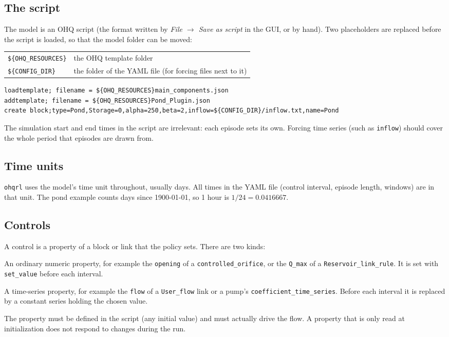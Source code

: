 \documentclass[11pt]{article}
\newcommand{\code}[1]{\texttt{#1}}
\begin{document}
\subsection{The script}
The model is an OHQ script (the format written by \emph{File $\to$ Save
as script} in the GUI, or by hand). Two placeholders are replaced before
the script is loaded, so that the model folder can be moved:
\begin{center}\small
\begin{tabular}{@{}ll@{}}
\toprule
\code{\$\{OHQ\_RESOURCES\}} & the OHQ template folder\\
\code{\$\{CONFIG\_DIR\}} & the folder of the YAML file (for forcing files next to it)\\
\bottomrule
\end{tabular}
\end{center}
\begin{lstlisting}
loadtemplate; filename = ${OHQ_RESOURCES}main_components.json
addtemplate; filename = ${OHQ_RESOURCES}Pond_Plugin.json
create block;type=Pond,Storage=0,alpha=250,beta=2,inflow=${CONFIG_DIR}/inflow.txt,name=Pond
\end{lstlisting}
The simulation start and end times in the script are irrelevant: each
episode sets its own. Forcing time series (such as \code{inflow}) should
cover the whole period that episodes are drawn from.

\subsection{Time units}
\code{ohqrl} uses the model's time unit throughout, usually days. All times
in the YAML file (control interval, episode length, windows) are in that
unit. The pond example counts days since 1900-01-01, so 1 hour is
$1/24 = 0.0416667$.

\subsection{Controls}
A control is a property of a block or link that the policy sets. There are
two kinds:
\begin{description}[style=nextline]
\item[\code{value}] An ordinary numeric property, for example the
  \code{opening} of a \code{controlled\_orifice}, or the \code{Q\_max} of a
  \code{Reservoir\_link\_rule}. It is set with \code{set\_value} before
  each interval.
\item[\code{timeseries}] A time-series property, for example the
  \code{flow} of a \code{User\_flow} link or a pump's
  \code{coefficient\_time\_series}. Before each interval it is replaced by
  a constant series holding the chosen value.
\end{description}
The property must be defined in the script (any initial value) and must
actually drive the flow. A property that is only read at initialization
does not respond to changes during the run.
\end{document}
